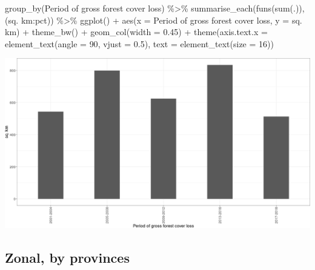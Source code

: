 \documentclass[10pt,landscape,a3paper]{article}
\newenvironment{Shaded}{\begin{snugshade}}{\end{snugshade}}
\newcommand{\AttributeTok}[1]{\textcolor[rgb]{0.77,0.63,0.00}{#1}}
\newcommand{\DecValTok}[1]{\textcolor[rgb]{0.00,0.00,0.81}{#1}}
\newcommand{\FloatTok}[1]{\textcolor[rgb]{0.00,0.00,0.81}{#1}}
\newcommand{\FunctionTok}[1]{\textcolor[rgb]{0.00,0.00,0.00}{#1}}
\newcommand{\NormalTok}[1]{#1}
\newcommand{\SpecialCharTok}[1]{\textcolor[rgb]{0.00,0.00,0.00}{#1}}
\newcommand{\StringTok}[1]{\textcolor[rgb]{0.31,0.60,0.02}{#1}}
\begin{document}
\begin{Shaded}
\begin{Highlighting}[]
  \FunctionTok{group\_by}\NormalTok{(}\StringTok{\textasciigrave{}}\AttributeTok{Period of gross forest cover loss}\StringTok{\textasciigrave{}}\NormalTok{) }\SpecialCharTok{\%\textgreater{}\%}
  \FunctionTok{summarise\_each}\NormalTok{(}\FunctionTok{funs}\NormalTok{(}\FunctionTok{sum}\NormalTok{(.)), (}\StringTok{\textasciigrave{}}\AttributeTok{sq. km}\StringTok{\textasciigrave{}}\SpecialCharTok{:}\NormalTok{pct)) }\SpecialCharTok{\%\textgreater{}\%} 
  \FunctionTok{ggplot}\NormalTok{() }\SpecialCharTok{+} \FunctionTok{aes}\NormalTok{(}\AttributeTok{x =} \StringTok{\textasciigrave{}}\AttributeTok{Period of gross forest cover loss}\StringTok{\textasciigrave{}}\NormalTok{, }\AttributeTok{y =} \StringTok{\textasciigrave{}}\AttributeTok{sq. km}\StringTok{\textasciigrave{}}\NormalTok{) }\SpecialCharTok{+}
  \FunctionTok{theme\_bw}\NormalTok{() }\SpecialCharTok{+} \FunctionTok{geom\_col}\NormalTok{(}\AttributeTok{width =} \FloatTok{0.45}\NormalTok{) }\SpecialCharTok{+}
  \FunctionTok{theme}\NormalTok{(}\AttributeTok{axis.text.x =} \FunctionTok{element\_text}\NormalTok{(}\AttributeTok{angle =} \DecValTok{90}\NormalTok{, }\AttributeTok{vjust =} \FloatTok{0.5}\NormalTok{), }\AttributeTok{text =} \FunctionTok{element\_text}\NormalTok{(}\AttributeTok{size =} \DecValTok{16}\NormalTok{))}
\end{Highlighting}
\end{Shaded}

\begin{center}\includegraphics[width=0.5\linewidth]{img/year-of-gross-forest-cover-loss-nationwide-by-period-1} \end{center}

\hypertarget{zonal-by-provinces}{%
\subsection{Zonal, by provinces}\label{zonal-by-provinces}}
\end{document}
